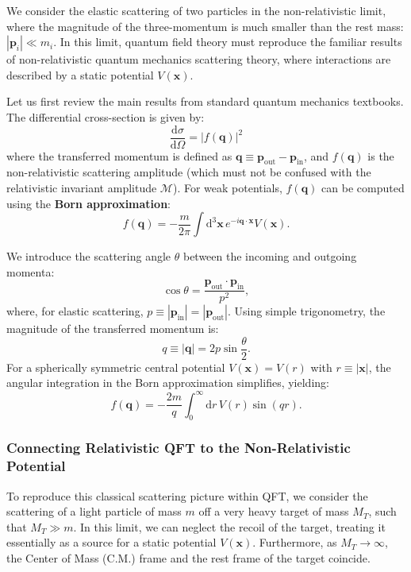 We consider the elastic scattering of two particles in the non-relativistic limit, where the magnitude of the three-momentum is much smaller than the rest mass: $|\mathbf{p}_i| \ll m_i$. In this limit, quantum field theory must reproduce the familiar results of non-relativistic quantum mechanics scattering theory, where interactions are described by a static potential $V(\mathbf{x})$.

Let us first review the main results from standard quantum mechanics textbooks. The differential cross-section is given by:
\[
    \frac{\mathrm{d} \sigma}{\mathrm{d} \Omega} = |f(\mathbf{q})|^2
\]
where the transferred momentum is defined as $\mathbf{q} \equiv \mathbf{p}_{\text{out}} - \mathbf{p}_{\text{in}}$, and $f(\mathbf{q})$ is the non-relativistic scattering amplitude (which must not be confused with the relativistic invariant amplitude $\mathcal{M}$). For weak potentials, $f(\mathbf{q})$ can be computed using the \textbf{Born approximation}:
\[
    f(\mathbf{q}) = -\frac{m}{2\pi} \int \mathrm{d}^3\mathbf{x} \, e^{-i\mathbf{q}\cdot\mathbf{x}} V(\mathbf{x}).
\]


We introduce the scattering angle $\theta$ between the incoming and outgoing momenta:
\[
    \cos\theta = \frac{\mathbf{p}_{\text{out}} \cdot \mathbf{p}_{\text{in}}}{p^2},
\]
where, for elastic scattering, $p \equiv |\mathbf{p}_{\text{in}}| = |\mathbf{p}_{\text{out}}|$. Using simple trigonometry, the magnitude of the transferred momentum is:
\[
    q \equiv |\mathbf{q}| = 2p \sin\frac{\theta}{2}.
\]
For a spherically symmetric central potential $V(\mathbf{x}) = V(r)$ with $r \equiv |\mathbf{x}|$, the angular integration in the Born approximation simplifies, yielding:
\[
    f(\mathbf{q}) = -\frac{2m}{q} \int_0^\infty \mathrm{d}r \, V(r) \sin(qr).
\]

\subsubsection{Connecting Relativistic QFT to the Non-Relativistic Potential}
To reproduce this classical scattering picture within QFT, we consider the scattering of a light particle of mass $m$ off a very heavy target of mass $M_T$, such that $M_T \gg m$. In this limit, we can neglect the recoil of the target, treating it essentially as a source for a static potential $V(\mathbf{x})$. Furthermore, as $M_T \to \infty$, the Center of Mass (C.M.) frame and the rest frame of the target coincide.

